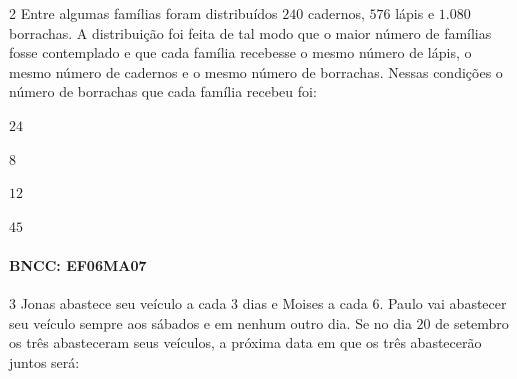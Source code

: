 {%

\num{2}  Entre algumas famílias foram distribuídos $240$ cadernos, $576$ lápis e
$1.080$ borrachas. A distribuição foi feita de tal modo que o maior número
de famílias fosse contemplado e que cada família recebesse o mesmo
número de lápis, o mesmo número de cadernos e o mesmo número de
borrachas. Nessas condições o número de borrachas que cada família
recebeu foi:

\begin{escolha}
\item $24$ 
\item $8$ 
\item $12$ 
\item $45$
\end{escolha}

\paragraph{BNCC: EF06MA07 }


\num{3}  Jonas abastece seu veículo a cada $3$ dias e Moises a cada $6$. Paulo vai
abastecer seu veículo sempre aos sábados e em nenhum outro dia. Se no
dia $20$ de setembro os três abasteceram seus veículos, a próxima data em
que os três abastecerão juntos será:

}
